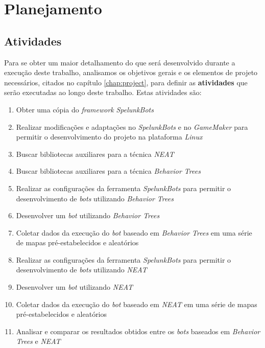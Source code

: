 \chapter{\label{chap:work-plan}Planejamento}


\section{\label{section:work-plan-activities}Atividades}
Para se obter um maior detalhamento do que será desenvolvido durante a execução
deste trabalho, analisamos os objetivos gerais e os elementos de projeto
necessários, citados no capítulo \ref{chap:project}, para definir as
\textbf{atividades} que serão executadas ao longo deste trabalho. Estas
atividades são:

\begin{enumerate}
	\item
		Obter uma cópia do \textit{framework} \textit{SpelunkBots}
	\item
		Realizar modificações e adaptações no \textit{SpelunkBots} e no
		\textit{GameMaker} para permitir o desenvolvimento do projeto na
		plataforma \textit{Linux}
	\item
		Buscar bibliotecas auxiliares para a técnica \textit{NEAT}
	\item
		Buscar bibliotecas auxiliares para a técnica \textit{Behavior Trees}
	\item
		Realizar as configurações da ferramenta \textit{SpelunkBots} para
		permitir o desenvolvimento de \textit{bots} utilizando \textit{Behavior
		Trees}
	\item
		Desenvolver um \textit{bot} utilizando \textit{Behavior Trees}
	\item
		Coletar dados da execução do \textit{bot} baseado em \textit{Behavior
		Trees} em uma série de mapas pré-estabelecidos e aleatórios
	\item
		Realizar as configurações da ferramenta \textit{SpelunkBots} para
		permitir o desenvolvimento de \textit{bots} utilizando \textit{NEAT}
	\item
		Desenvolver um \textit{bot} utilizando \textit{NEAT}
	\item
		Coletar dados da execução do \textit{bot} baseado em \textit{NEAT} em
		uma série de mapas pré-estabelecidos e aleatórios
	\item
		Analisar e comparar os resultados obtidos entre os \textit{bots}
		baseados em \textit{Behavior Trees} e \textit{NEAT}
\end{enumerate}


